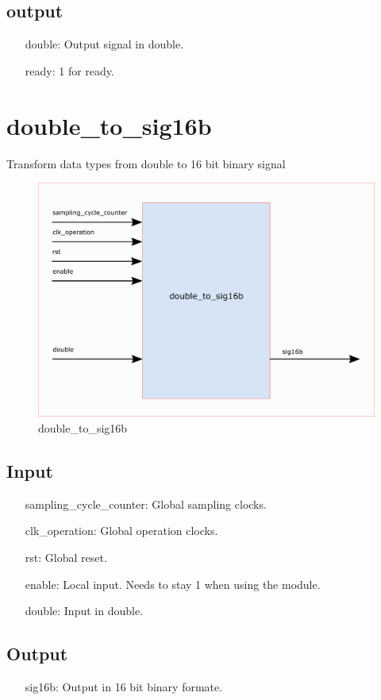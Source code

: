\documentclass[twoside,a4paper]{refart}
\begin{document}
\subsection{output}
\begin{itemize}
	\item[double:] Output signal in double.
	\item[ready:] 1 for ready.
\end{itemize}
\section{double\_to\_sig16b}
Transform data types from double to 16 bit binary signal
\begin{figure}[H]
	\centering
	\includegraphics[scale=1.2]{double_to_sig16b.png}
	\caption{double\_to\_sig16b}
	\label{}
\end{figure}
\subsection{Input}
\begin{itemize}
	\item[sampling\_cycle\_counter:] Global sampling clocks.
	\item[clk\_operation:] Global operation clocks.
	\item[rst:      ] Global reset.
	\item[enable:] Local input. Needs to stay 1 when using the module.
	\item[double:] Input in double.
\end{itemize}
\subsection{Output}
\begin{itemize}
	\item[sig16b:] Output in 16 bit binary formate.
\end{itemize}
\end{document}
